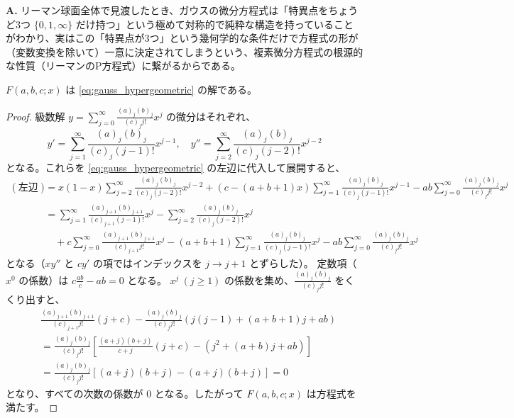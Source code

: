 \begin{Q}
\textbf{A.} リーマン球面全体で見渡したとき、ガウスの微分方程式は「特異点をちょうど3つ $\{0, 1, \infty\}$ だけ持つ」という極めて対称的で純粋な構造を持っていることがわかり、実はこの「特異点が3つ」という幾何学的な条件だけで方程式の形が（変数変換を除いて）一意に決定されてしまうという、複素微分方程式の根源的な性質（リーマンのP方程式）に繋がるからである。
\end{Q}
\begin{lemma}\label{lem:hypergeometric_solution}
    $F(a,b,c;x)$ は \eqref{eq:gauss_hypergeometric} の解である。
\end{lemma}

\begin{proof}
    級数解 $y = \sum_{j=0}^{\infty}\frac{(a)_{j}(b)_{j}}{(c)_{j}j!}x^{j}$ の微分はそれぞれ、
    \[
    y' = \sum_{j=1}^{\infty}\frac{(a)_{j}(b)_{j}}{(c)_{j}(j-1)!}x^{j-1}, \quad
    y'' = \sum_{j=2}^{\infty}\frac{(a)_{j}(b)_{j}}{(c)_{j}(j-2)!}x^{j-2}
    \]
    となる。これらを \eqref{eq:gauss_hypergeometric} の左辺に代入して展開すると、
    \begin{align*}
    (\text{左辺}) &= x(1-x)\sum_{j=2}^{\infty}\frac{(a)_{j}(b)_{j}}{(c)_{j}(j-2)!}x^{j-2} + (c-(a+b+1)x)\sum_{j=1}^{\infty}\frac{(a)_{j}(b)_{j}}{(c)_{j}(j-1)!}x^{j-1} - ab\sum_{j=0}^{\infty}\frac{(a)_{j}(b)_{j}}{(c)_{j}j!}x^{j} \\
    &= \sum_{j=1}^{\infty}\frac{(a)_{j+1}(b)_{j+1}}{(c)_{j+1}(j-1)!}x^{j} - \sum_{j=2}^{\infty}\frac{(a)_{j}(b)_{j}}{(c)_{j}(j-2)!}x^{j} \\
    &\quad + c\sum_{j=0}^{\infty}\frac{(a)_{j+1}(b)_{j+1}}{(c)_{j+1}j!}x^{j} - (a+b+1)\sum_{j=1}^{\infty}\frac{(a)_{j}(b)_{j}}{(c)_{j}(j-1)!}x^{j} - ab\sum_{j=0}^{\infty}\frac{(a)_{j}(b)_{j}}{(c)_{j}j!}x^{j}
    \end{align*}
    となる（$x y''$ と $c y'$ の項ではインデックスを $j \to j+1$ とずらした）。
    定数項（$x^0$ の係数）は $c\frac{ab}{c} - ab = 0$ となる。
    $x^j \ (j \ge 1)$ の係数を集め、$\frac{(a)_{j}(b)_{j}}{(c)_{j}j!}$ をくくり出すと、
    \begin{align*}
    & \frac{(a)_{j+1}(b)_{j+1}}{(c)_{j+1}j!} (j + c) - \frac{(a)_{j}(b)_{j}}{(c)_{j}j!} \left( j(j-1) + (a+b+1)j + ab \right) \\
    &= \frac{(a)_{j}(b)_{j}}{(c)_{j}j!} \left[ \frac{(a+j)(b+j)}{c+j}(j+c) - (j^2 + (a+b)j + ab) \right] \\
    &= \frac{(a)_{j}(b)_{j}}{(c)_{j}j!} \left[ (a+j)(b+j) - (a+j)(b+j) \right] = 0
    \end{align*}
    となり、すべての次数の係数が $0$ となる。したがって $F(a,b,c;x)$ は方程式を満たす。
\end{proof}

